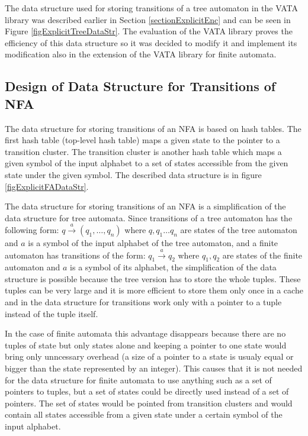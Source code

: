 The data structure used for storing transitions of a tree automaton in the VATA library was described earlier in Section \ref{sectionExplicitEnc} and can be seen
in Figure \ref{figExplicitTreeDataStr}. The evaluation of the VATA library \cite{libvata} proves the efficiency of this data structure so it was
decided to modify it and implement its modification also in the extension of the VATA library for finite automata.

\subsection{Design of Data Structure for Transitions of NFA}
The data structure for storing transitions of an NFA is based on hash tables. The first hash table (top-level hash table) maps a given state to the pointer to
a transition cluster. The transition cluster is another hash table which maps a given symbol of the input alphabet to a set of states accessible from
the given state under the given symbol. 
The described data structure is in figure \ref{figExplicitFADataStr}.

The data structure for storing transitions of an NFA is a simplification of the data structure for tree automata. Since transitions of a tree automaton
has the following form: $q \xrightarrow{a} (q_1,\ldots,q_n)$ where $q,q_1\ldots q_n$ are states of the tree automaton and $a$ is a symbol of 
the input alphabet of the tree automaton, and a finite automaton has transitions of the form: $q_1 \xrightarrow{a} q_2$ 
where $q_1,q_2$ are states of the finite automaton and $a$ is a symbol of its alphabet, the simplification of the data structure is possible because 
the tree version has to store the whole tuples. These tuples can be very large and it is more efficient to store them only once in a cache and 
in the data structure for transitions work only with a pointer to a tuple instead of the tuple itself. 

In the case of finite automata this advantage disappears because there are no tuples of state but only states alone and keeping a pointer to one state
would bring only unncessary overhead 
(a size of a pointer to a state is usualy equal or bigger than the state represented by an integer). This causes that it is not needed 
for the data structure for finite automata to use 
anything such as a set of pointers to tuples, but a set of states could be directly used instead of
a set of pointers. The set of states would be pointed from transition clusters and would contain all states accessible from a given state under a 
certain symbol of the input alphabet.

